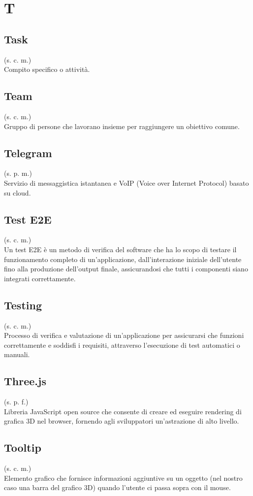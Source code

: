 \section{T}
\subsection{Task}
(s. c. m.)\\
Compito specifico o attività.
\subsection{Team}
(s. c. m.)\\
\label{Team}
Gruppo di persone che lavorano insieme per raggiungere un obiettivo comune.
\subsection{Telegram}
(s. p. m.)\\
Servizio di messaggistica istantanea e VoIP (Voice over Internet Protocol)
basato su cloud.
\subsection{Test E2E}
(s. c. m.)\\
Un test E2E è un metodo di verifica del software che ha lo scopo di testare il funzionamento completo di un'applicazione,
dall'interazione iniziale dell'utente fino alla produzione dell'output finale, assicurandosi che tutti i componenti siano integrati correttamente.
\subsection{Testing}
\label{Testing}
(s. c. m.)\\
Processo di verifica e valutazione di un'applicazione per assicurarsi che funzioni correttamente e
soddisfi i requisiti, attraverso l'esecuzione di test automatici o manuali.
\subsection{Three.js}
(s. p. f.)\\
Libreria JavaScript open source che consente di creare ed eseguire rendering
di grafica 3D nel browser, fornendo agli sviluppatori un'astrazione di alto livello.
\subsection{Tooltip}
(s. c. m.)\\
Elemento grafico che fornisce informazioni aggiuntive su un oggetto 
(nel nostro caso una barra del grafico 3D) quando l'utente ci passa sopra con il mouse. 
\pagebreak
